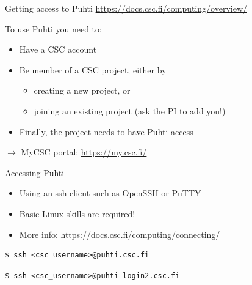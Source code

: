 \documentclass[aspectratio=1610,14pt]{beamer}
\newcommand{\link}[1]{\alert{\url{#1}}}
\begin{document}
\begin{frame}{Getting access to Puhti}
  \link{https://docs.csc.fi/computing/overview/}

  \vspace{1em}

  To use Puhti you need to:
  \begin{itemize}
  \item Have a CSC account
  \item Be member of a CSC project, either by
    \begin{itemize}
    \item creating a new project, or
    \item joining an existing project (ask the PI to add you!)
    \end{itemize}
  \item Finally, the project needs to have Puhti access
  \end{itemize}

  \vspace{1em}

  $\rightarrow$ \quad MyCSC portal: \link{https://my.csc.fi/}

\end{frame}

\begin{frame}[fragile]{Accessing Puhti}
  \begin{itemize}
  \item Using an ssh client such as OpenSSH or PuTTY
  \item Basic Linux skills are required!
  \item More info: \link{https://docs.csc.fi/computing/connecting/}
  \end{itemize}

  \vspace{1em}

\begin{verbatim}
$ ssh <csc_username>@puhti.csc.fi
\end{verbatim}

\begin{verbatim}
$ ssh <csc_username>@puhti-login2.csc.fi
\end{verbatim}

\end{frame}
\end{document}
